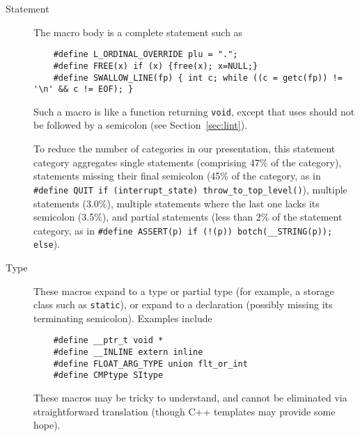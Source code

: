 \documentclass[10pt]{article}
\begin{document}
\begin{description}
\item[Statement]\label{item:statement-category}
  The macro body is a complete statement such as
\begin{verbatim}
    #define L_ORDINAL_OVERRIDE plu = ".";
    #define FREE(x) if (x) {free(x); x=NULL;}
    #define SWALLOW_LINE(fp) { int c; while ((c = getc(fp)) != '\n' && c != EOF); }
\end{verbatim}
  Such a macro is like a function returning {\tt void}, except that uses
  should not be followed by a semicolon (see Section~\ref{sec:lint}).
    
  To reduce the number of categories in our presentation, this statement
  category aggregates single statements (comprising 47\% of the category),
  statements missing their final semicolon (45\% of the category, as in
  {\tt \#define QUIT if (\verb|interrupt_state|)
  \verb|throw_to_top_level|()}), multiple statements (3.0\%), multiple
statements where the last one lacks its semicolon (3.5\%), and partial
statements (less than 2\% of the statement category, as in {\tt \#define
ASSERT(p) if (!(p)) botch(\verb|__STRING|(p)); else}).

\item[Type] 
  These macros expand to a type or partial type (for example, a storage
  class such as {\tt static}),
  or expand to a declaration (possibly missing its terminating semicolon).
  Examples include
\begin{verbatim}
    #define __ptr_t void *
    #define __INLINE extern inline
    #define FLOAT_ARG_TYPE union flt_or_int
    #define CMPtype SItype
\end{verbatim}
  These macros may be tricky to understand, and cannot be eliminated via
  straightforward translation (though C++ templates may provide some hope).




\end{description}
\end{document}
